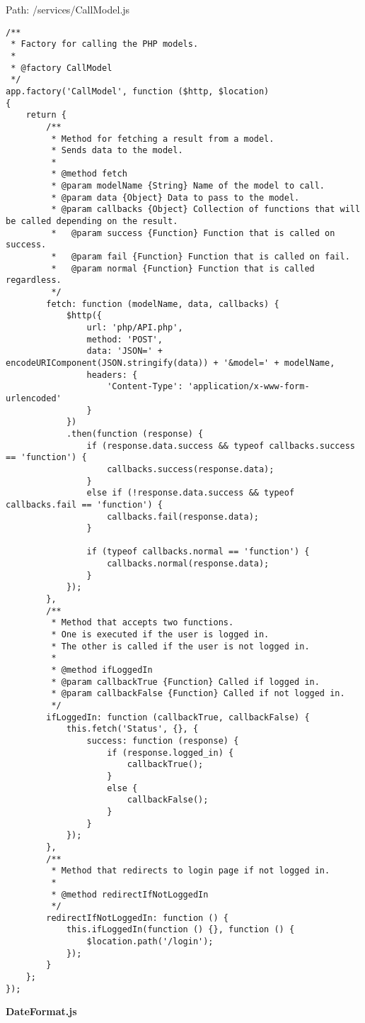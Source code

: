 Path: /services/CallModel.js
{\scriptsize
\begin{lstlisting}
/**
 * Factory for calling the PHP models.
 *
 * @factory CallModel
 */
app.factory('CallModel', function ($http, $location)
{
	return {
		/**
		 * Method for fetching a result from a model.
		 * Sends data to the model.
		 *
		 * @method fetch
		 * @param modelName {String} Name of the model to call.
		 * @param data {Object} Data to pass to the model.
		 * @param callbacks {Object} Collection of functions that will be called depending on the result.
		 *   @param success {Function} Function that is called on success.
		 *   @param fail {Function} Function that is called on fail.
		 *   @param normal {Function} Function that is called regardless.
		 */
		fetch: function (modelName, data, callbacks) {
			$http({
				url: 'php/API.php',
				method: 'POST',
				data: 'JSON=' + encodeURIComponent(JSON.stringify(data)) + '&model=' + modelName,
				headers: {
					'Content-Type': 'application/x-www-form-urlencoded'
				}
			})
			.then(function (response) {
				if (response.data.success && typeof callbacks.success == 'function') {
					callbacks.success(response.data);
				}
				else if (!response.data.success && typeof callbacks.fail == 'function') {
					callbacks.fail(response.data);
				}

				if (typeof callbacks.normal == 'function') {
					callbacks.normal(response.data);
				}
			});
		},
		/**
		 * Method that accepts two functions.
		 * One is executed if the user is logged in.
		 * The other is called if the user is not logged in.
		 *
		 * @method ifLoggedIn
		 * @param callbackTrue {Function} Called if logged in.
		 * @param callbackFalse {Function} Called if not logged in.
		 */
		ifLoggedIn: function (callbackTrue, callbackFalse) {
			this.fetch('Status', {}, {
				success: function (response) {
					if (response.logged_in) {
						callbackTrue();
					}
					else {
						callbackFalse();
					}
				}
			});
		},
		/**
		 * Method that redirects to login page if not logged in.
		 *
		 * @method redirectIfNotLoggedIn
		 */
		redirectIfNotLoggedIn: function () {
			this.ifLoggedIn(function () {}, function () {
				$location.path('/login');
			});
		}
	};
});\end{lstlisting}
}
\textbf{DateFormat.js}

